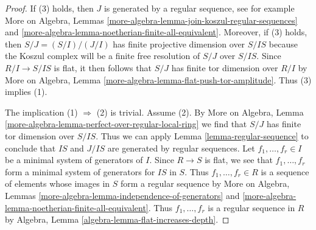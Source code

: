 \documentclass{stacks-project}
\theoremstyle{plain}
\theoremstyle{definition}
\theoremstyle{remark}
\numberwithin{equation}{subsection}
\begin{document}
\begin{proof}
If (3) holds, then $J$ is generated by a regular sequence, see for example
More on Algebra, Lemmas
\ref{more-algebra-lemma-join-koszul-regular-sequences} and
\ref{more-algebra-lemma-noetherian-finite-all-equivalent}.
Moreover, if (3) holds, then $S/J = (S/I)/(J/I)$
has finite projective dimension over $S/IS$ because the Koszul
complex will be a finite free resolution of $S/J$ over $S/IS$.
Since $R/I \to S/IS$ is flat, it then follows that $S/J$ has finite
tor dimension over $R/I$ by
More on Algebra, Lemma \ref{more-algebra-lemma-flat-push-tor-amplitude}.
Thus (3) implies (1).

\medskip\noindent
The implication (1) $\Rightarrow$ (2) is trivial.
Assume (2). By
More on Algebra, Lemma \ref{more-algebra-lemma-perfect-over-regular-local-ring}
we find that $S/J$ has finite tor dimension over $S/IS$.
Thus we can apply Lemma \ref{lemma-regular-sequence}
to conclude that $IS$ and $J/IS$ are generated by regular sequences.
Let $f_1, \ldots, f_r \in I$ be a minimal system of generators of $I$.
Since $R \to S$ is flat, we see that $f_1, \ldots, f_r$ form a minimal
system of generators for $IS$ in $S$. Thus $f_1, \ldots, f_r \in R$
is a sequence of elements whose images in $S$ form a regular sequence
by More on Algebra, Lemmas
\ref{more-algebra-lemma-independence-of-generators} and
\ref{more-algebra-lemma-noetherian-finite-all-equivalent}.
Thus $f_1, \ldots, f_r$ is a regular sequence in $R$ by
Algebra, Lemma \ref{algebra-lemma-flat-increases-depth}.
\end{proof}
\end{document}
